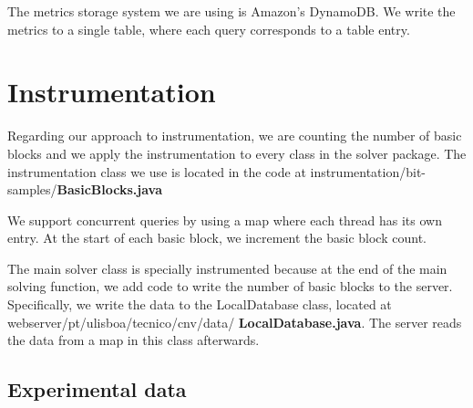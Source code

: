 \documentclass[10pt,twocolumn]{article}
\begin{document}
The metrics storage system we are using is Amazon's DynamoDB. We write the metrics to a single table, where each query corresponds to a table entry.

\section{Instrumentation}

Regarding our approach to instrumentation, we are counting the number of basic blocks and we apply the instrumentation to every class in the solver package.
The instrumentation class we use is located in the code at instrumentation/bit-samples/\textbf{BasicBlocks.java}

We support concurrent queries by using a map where each thread has its own entry.
At the start of each basic block, we increment the basic block count.

The main solver class is specially instrumented because at the end of the main solving function, we add code to write the number of basic blocks to the server.
Specifically, we write the data to the LocalDatabase class, located at webserver/pt/ulisboa/tecnico/cnv/data/ \textbf{LocalDatabase.java}.
The server reads the data from a map in this class afterwards.

\subsection{Experimental data}

\end{document}
